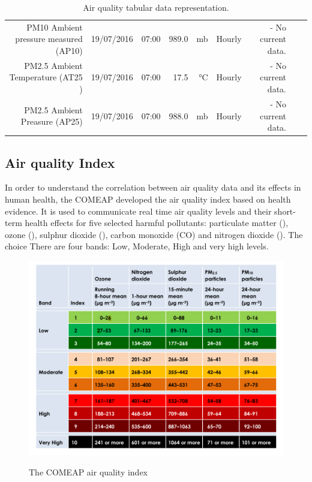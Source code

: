 \begin{table}[ht]
\begin{adjustbox}{width=1.2\textwidth,center=\textwidth}
\begin{tabular}{rlrrrrrrr}
	PM10 Ambient pressure measured (AP10) & 19/07/2016 & 07:00 & 989.0 & mb & Hourly & - No current data. \\
	PM2.5 Ambient Temperature (AT25 ) & 19/07/2016 & 07:00 & 17.5 & °C & Hourly & - No current data. \\
	PM2.5 Ambient Preasure (AP25) & 19/07/2016 & 07:00 & 988.0 & mb & Hourly & - No current data. \\
   \hline
\end{tabular}
\end{adjustbox}
\caption{Air quality tabular data representation. \cite{DepartmentforEnvironment}}
\label{tab:pollution_tabular_data}
\end{table} 

\subsection{Air quality Index}
In order to understand the correlation between air quality data and its effects in human health, the \ac{COMEAP} developed the air quality index based on health evidence. It is used to communicate real time air quality levels and their short-term health effects for five selected harmful pollutants: particulate matter (\PMTEN), ozone (\OTHREE), sulphur dioxide (\SOTWO), carbon monoxide (CO) and nitrogen dioxide (\NOTWO). The choice 
There are four bands: Low, Moderate, High and very high levels. 

\begin{figure}[!htb]
\begin{adjustbox}{width=1\textwidth,center=\textwidth}
  \centering
  \includegraphics[scale=.8]{images/air_quality_index.png}
  \label{fig:air_quality_index}
\end{adjustbox}
  \caption[Great smog of 1952]{The COMEAP air quality index \cite{HealthProtectionAgencyfortheCommitteeontheMedicalEffectsofAirPollutants2011}}
\end{figure}

